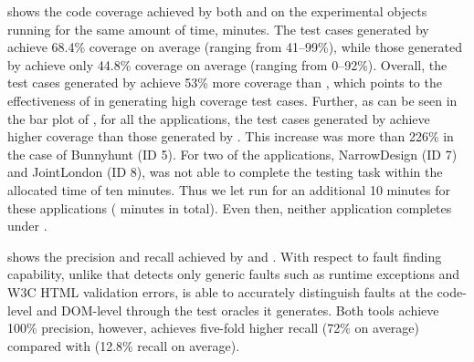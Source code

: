  shows the code coverage achieved by  both \tool and \artemis on the experimental objects running for the same amount of time,  minutes.
The test cases generated by \tool achieve 68.4\% coverage on average (ranging from 41--99\%), while those generated by \artemis achieve only 44.8\% coverage on average (ranging from 0--92\%).
Overall, the test cases generated by \tool achieve 53\% more coverage than \artemis, which points to the effectiveness of \tool in generating high coverage test cases. 
Further, as can be seen in the bar plot of , for all the applications, the test cases generated by \tool achieve higher coverage than those generated by \artemis. 
This increase was more than 226\% in the case of Bunnyhunt (ID 5). %
For two of the applications, NarrowDesign (ID 7) and JointLondon (ID 8), \artemis was not able to complete the testing task within the allocated time of ten minutes.
Thus we let \artemis run for an additional 10 minutes for these applications ( minutes in total). Even then, neither application completes under \artemis. 

 shows the precision and recall achieved by \tool and \artemis.
With respect to fault finding capability, unlike \artemis that detects only generic faults such as runtime exceptions and W3C HTML validation errors, \tool is able to accurately distinguish faults at the code-level and DOM-level through the test oracles it generates. Both tools achieve 100\% precision, however, \tool achieves five-fold higher recall (72\% on average) compared with \artemis (12.8\% recall on average). %
